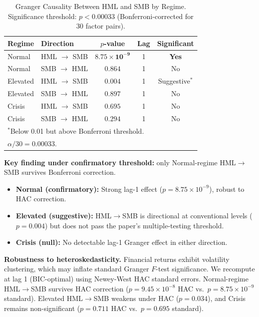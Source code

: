 \documentclass{uai2026}
\begin{document}
\begin{table}[t]
\centering
\caption{Granger Causality Between HML and SMB by Regime.\\
Significance threshold: $p < 0.00033$ (Bonferroni-corrected for 30 factor pairs).}
\label{tab:main}
\small
\begin{tabular}{llccc}
\toprule
Regime & Direction & $p$-value & Lag & Significant \\
\midrule
Normal & HML $\to$ SMB & $\mathbf{8.75 \times 10^{-9}}$ & 1 & \textbf{Yes} \\
Normal & SMB $\to$ HML & $0.864$ & 1 & No \\
\midrule
Elevated & HML $\to$ SMB & $0.004$ & 1 & Suggestive$^*$ \\
Elevated & SMB $\to$ HML & $0.897$ & 1 & No \\
\midrule
Crisis & HML $\to$ SMB & $0.695$ & 1 & No \\
Crisis & SMB $\to$ HML & $0.294$ & 1 & No \\
\bottomrule
\multicolumn{5}{l}{\footnotesize $^*$Below 0.01 but above Bonferroni threshold.} \\
\multicolumn{5}{l}{\footnotesize $\alpha/30 = 0.00033$.}
\end{tabular}
\end{table}

\textbf{Key finding under confirmatory threshold:} only Normal-regime
HML$\to$SMB survives Bonferroni correction.
\begin{itemize}
    \item \textbf{Normal (confirmatory):} Strong lag-1 effect
    ($p = 8.75 \times 10^{-9}$), robust to HAC correction.
    \item \textbf{Elevated (suggestive):} HML$\to$SMB is directional at
    conventional levels ($p = 0.004$) but does not pass the paper's
    multiple-testing threshold.
    \item \textbf{Crisis (null):} No detectable lag-1 Granger effect in either
    direction.
\end{itemize}

\textbf{Robustness to heteroskedasticity.}
Financial returns exhibit volatility clustering, which may inflate standard Granger
$F$-test significance. We recompute at lag 1 (BIC-optimal) using
Newey-West HAC standard errors.
Normal-regime HML$\to$SMB survives HAC correction
($p = 9.45 \times 10^{-8}$ HAC vs.\ $p = 8.75 \times 10^{-9}$ standard).
Elevated HML$\to$SMB weakens under HAC ($p = 0.034$), and Crisis remains
non-significant ($p = 0.711$ HAC vs.\ $p = 0.695$ standard).
\end{document}
